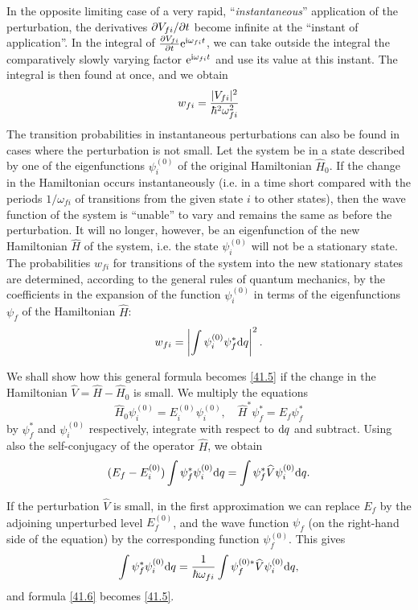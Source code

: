 In the opposite limiting case of a very rapid, “\textit{instantaneous}” application of the perturbation, the derivatives $ \partial V_{fi}/\partial t $ become infinite at the “instant of application”. In the integral of $ \frac{\partial V_{fi}}{\partial t}\mathrm{e}^{\mathrm{i}\omega_{fi}t} $, we can take outside the integral the comparatively slowly varying factor $ \mathrm{e}^{\mathrm{i}\omega_{fi}t} $ and use its value at this instant. The integral is then found at once, and we obtain
\begin{equation}\label{41.5}
w_{fi}=\frac{|V_{fi}|^2}{\hbar^2\omega_{fi}^2}
\end{equation}
The transition probabilities in instantaneous perturbations can also be found in cases where the perturbation is not small. Let the system be in a state described by one of the eigenfunctions $ \psi_i^{(0)} $ of the original Hamiltonian $ \hat{H}_0 $. If the change in the Hamiltonian occurs instantaneously (i.e. in a time short compared with the periods $ 1/\omega_{fi} $ of transitions from the given state $ i $ to other states), then the wave function of the system is “unable” to vary and remains the same as before the perturbation. It will no longer, however, be an eigenfunction of the new Hamiltonian $\hat{H}$ of the system, i.e. the state $ \psi_i^{(0)} $ will not be a stationary state. The probabilities $ w_{fi} $ for transitions of the system into the new stationary states are determined, according to the general rules of quantum mechanics, by the coefficients in the expansion of the function $ \psi_i^{(0)} $ in terms of the eigenfunctions $ \psi_f $ of the Hamiltonian $\hat{H}$:
\begin{equation}\label{41.6}
w_{fi}=\left|\int\psi_i^{(0)}\psi_f^*\mathrm{d} q \right|^2.
\end{equation}


We shall show how this general formula becomes \eqref{41.5} if the change in the Hamiltonian $ \hat{V}=\hat{H}-\hat{H}_0 $ is small. We multiply the equations
\[ \hat{H}_0\psi_i^{(0)}=E_i^{(0)}\psi_i^{(0)},\quad\hat{H}^*\psi_f^*=E_f\psi_f^* \]
by $ \psi_f^* $ and $ \psi_i^{(0)} $ respectively, integrate with respect to $\mathrm{d} q $ and subtract. Using also the self-conjugacy of the operator $\hat{H}$, we obtain
\[ (E_f-E_i^{(0)})\int\psi_f^*\psi_i^{(0)}\mathrm{d} q=\int\psi_f^*\widehat{V}\psi_i^{(0)}\mathrm{d} q. \]



If the perturbation $\hat{V}$ is small, in the first approximation we can replace $ E_f $ by the adjoining unperturbed level $ E_f^{(0)} $, and the wave function $ \psi_f $ (on the right-hand side of the equation) by the corresponding function $ \psi_f^{(0)} $. This gives
\[ \int\psi_f^*\psi_i^{(0)}\mathrm{d} q=\frac{1}{\hbar\omega_{fi}}\int\psi_f^{(0)*}\widehat{V}\psi_i^{(0)}\mathrm{d} q, \]
and formula \eqref{41.6} becomes \eqref{41.5}.




